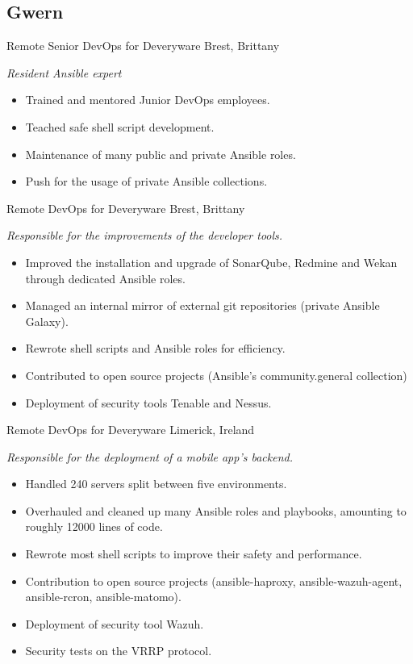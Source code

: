 \documentclass[]{friggeri-cv} %
\begin{document}
\subsection{Gwern}
\begin{entrylist}
 {Remote Senior DevOps for Deveryware} {Brest, Brittany} {
  \emph{Resident Ansible expert}
  \begin{itemize}
    \item Trained and mentored Junior DevOps employees.
    \item Teached safe shell script development.
    \item Maintenance of many public and private Ansible roles.
    \item Push for the usage of private Ansible collections.
  \end{itemize}
}
 {Remote DevOps for Deveryware} {Brest, Brittany} {
  \emph{Responsible for the improvements of the developer tools.}
  \begin{itemize}
    \item Improved the installation and upgrade of SonarQube, Redmine and Wekan through dedicated Ansible roles.
    \item Managed an internal mirror of external git repositories (private Ansible Galaxy).
    \item Rewrote shell scripts and Ansible roles for efficiency.
    \item Contributed to open source projects (Ansible's community.general collection)
    \item Deployment of security tools Tenable and Nessus.
  \end{itemize}
}
 {Remote DevOps for Deveryware} {Limerick, Ireland} {
  \emph{Responsible for the deployment of a mobile app's backend.}
  \begin{itemize}
    \item Handled 240 servers split between five environments.
    \item Overhauled and cleaned up many Ansible roles and playbooks, amounting to roughly 12000 lines of code.
    \item Rewrote most shell scripts to improve their safety and performance.
    \item Contribution to open source projects (ansible-haproxy, ansible-wazuh-agent, ansible-rcron, ansible-matomo).
    \item Deployment of security tool Wazuh.
    \item Security tests on the VRRP protocol.

\end{itemize}}
\end{entrylist}
\end{document}
